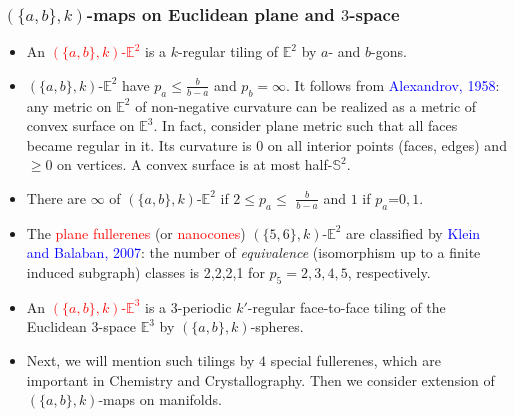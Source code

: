 \documentclass{beamer}
\begin{document}
\begin{frame}\frametitle{$(\{a,b\},k)$-maps on Euclidean plane and $3$-space}
\vspace{-2.5mm}
\begin{itemize}
\item An \textcolor{red}{$(\{a,b\},k)$-$\mathbb{E}^2$} is a $k$-regular tiling  of 
$\mathbb{E}^2$ by 
$a$- and $b$-gons. 

\item 
$(\{a,b\},k)$-$\mathbb{E}^2$ have
$p_a \leq \frac{b}{b-a}$ and $p_b=\infty$. It follows from
\textcolor{blue}{Alexandrov, 1958}: any metric on $\mathbb{E}^2$  of
non-negative curvature can be realized as a metric of
convex surface on $\mathbb{E}^3$.
In fact, consider plane metric such that
all faces became regular in it. Its curvature is $0$ on all
interior points (faces, edges) and $\geq 0$ on vertices. 
A convex
surface is at most half-$\mathbb{S}^2$.
\item There are $\infty$  of $(\{a,b\},k)$-$\mathbb{E}^2$ if $2$$\le$$ p_a$$\le$  
$\frac{b}{b-a}$ and  
$1$ if $p_a$=$0,1$.
\item The \textcolor{red}{plane fullerenes} (or \textcolor{red}{nanocones}) 
$(\{5,6\},k)$-$\mathbb{E}^2$ are classified by
\textcolor{blue}{Klein and Balaban, 2007}:
the number of {\em equivalence} (isomorphism up to a finite induced subgraph) classes is 
2,2,2,1 for $p_5=2,3,4,5$, respectively.

\pause

\item 
An \textcolor{red}{$(\{a,b\},k)$-$\mathbb{E}^3$} is a $3$-periodic $k'$-regular face-to-face tiling
of the
Euclidean $3$-space $\mathbb{E}^3$ by $(\{a,b\},k)$-spheres.
\item
Next, we will mention such tilings by $4$ special fullerenes, which are important  in Chemistry and 
Crystallography. 
Then we consider extension of $(\{a,b\},k)$-maps on manifolds. 
\end{itemize}
\end{frame}

\end{document}
